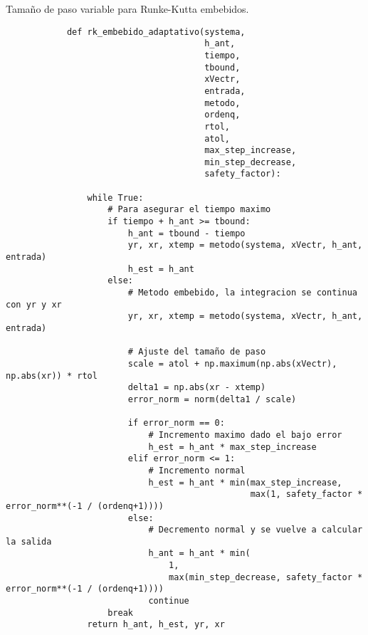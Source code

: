     \begin{longlisting}
        \caption[Tamaño de paso variable para Runke-Kutta embebidos]{Tamaño de paso variable para Runke-Kutta embebidos.}
        \label{code:embebidos}				
        \begin{verbatim}
            def rk_embebido_adaptativo(systema,
                                       h_ant,
                                       tiempo,
                                       tbound,
                                       xVectr,
                                       entrada,
                                       metodo,
                                       ordenq,
                                       rtol,
                                       atol,
                                       max_step_increase,
                                       min_step_decrease,
                                       safety_factor):
                
                while True:
                    # Para asegurar el tiempo maximo
                    if tiempo + h_ant >= tbound:
                        h_ant = tbound - tiempo
                        yr, xr, xtemp = metodo(systema, xVectr, h_ant, entrada)
                        h_est = h_ant
                    else:
                        # Metodo embebido, la integracion se continua con yr y xr
                        yr, xr, xtemp = metodo(systema, xVectr, h_ant, entrada)

                        # Ajuste del tamaño de paso
                        scale = atol + np.maximum(np.abs(xVectr), np.abs(xr)) * rtol
                        delta1 = np.abs(xr - xtemp)
                        error_norm = norm(delta1 / scale)

                        if error_norm == 0:
                            # Incremento maximo dado el bajo error
                            h_est = h_ant * max_step_increase
                        elif error_norm <= 1:
                            # Incremento normal
                            h_est = h_ant * min(max_step_increase,
                                                max(1, safety_factor * error_norm**(-1 / (ordenq+1))))
                        else:
                            # Decremento normal y se vuelve a calcular la salida
                            h_ant = h_ant * min(
                                1,
                                max(min_step_decrease, safety_factor * error_norm**(-1 / (ordenq+1))))
                            continue
                    break
                return h_ant, h_est, yr, xr
        \end{verbatim}
    \end{longlisting}

